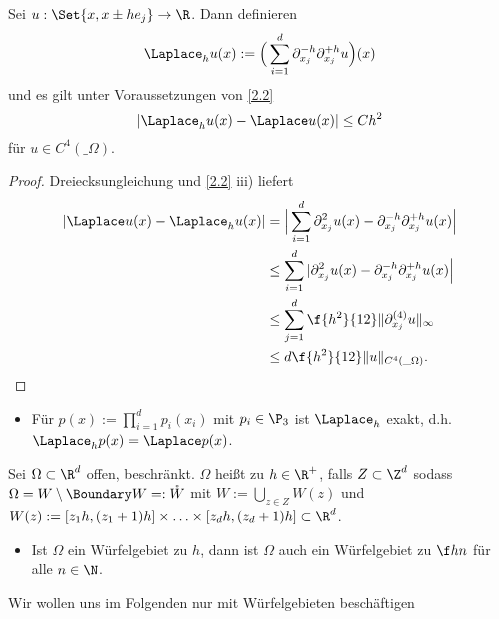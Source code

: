 \begin{kor} \label{2.3}
	Sei $u : \Set{x, x \pm h e_j} \to \R$.
	Dann definieren
	\begin{equation} \label{eq:2.1}
		\Laplace_h u(x) :=
		\Big(\sum_{i=1}^d \partial_{x_j}^{-h} \partial_{x_j}^{+h} u \Big) (x)
	\end{equation}
	und es gilt unter Voraussetzungen von \ref{2.2}
	\[
		|\Laplace_h u(x) - \Laplace u(x)| \le C h^2
	\]
	für $u \in C^4(\_\Omega)$.
	\begin{proof}
		Dreiecksungleichung und \ref{2.2} iii) liefert
		\begin{align*}
			|\Laplace u(x) - \Laplace_h u(x)|
			&= \Big| \sum_{i=1}^d \partial_{x_j}^2 u(x) - \partial_{x_j}^{-h} \partial_{x_j}^{+h} u(x) \Big| \\
			&\le \sum_{i=1}^d | \partial_{x_j}^2 u(x) - \partial_{x_j}^{-h} \partial_{x_j}^{+h} u(x) \Big| \\
			&\le \sum_{j=1}^d \f {h^2}{12} \|\partial_{x_j}^{(4)} u\|_\infty \\
			&\le d \f {h^2}{12} \|u\|_{C^4(\_\Omega)}.
		\end{align*}
	\end{proof}
	\begin{note}
		\begin{itemize}
			\item
				Für $p(x) := \prod_{i=1}^d p_i(x_i)$ mit $p_i \in \P_3$ ist $\Laplace_h$ exakt, d.h. $\Laplace_h p(x) = \Laplace p(x)$.
		\end{itemize}
	\end{note}
\end{kor}


\begin{df}[Würfelgebiet] \label{2.4}
	Sei $\Omega \subset \R^d$ offen, beschränkt.
	$\Omega$ heißt  zu $h \in \R^+$, falls $Z \subset \Z^d$ sodass $\Omega = W \setminus \Boundary W =: \mathring W$ mit $W := \bigcup_{z \in Z} W(z)$ und $W(z) := [z_1h , (z_1+1)h] \times \dotsc \times [z_d h, (z_d+1)h] \subset \R^d$.
	\begin{note}
		\begin{itemize}
			\item
				Ist $\Omega$ ein Würfelgebiet zu $h$, dann ist $\Omega$ auch ein Würfelgebiet zu $\f hn$ für alle $n \in \N$.
		\end{itemize}
	\end{note}
\end{df}

Wir wollen uns im Folgenden nur mit Würfelgebieten beschäftigen

